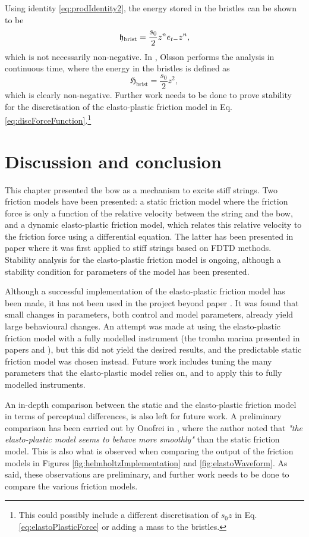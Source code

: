 Using identity \eqref{eq:prodIdentity2}, the energy stored in the bristles can be shown to be
\begin{equation}
    \mathfrak{h}_\text{brist} = \frac{s_0}{2}z^ne_{t-}z^n,
\end{equation}
which is not necessarily non-negative. In \cite{Olsson1996}, Olsson performs the analysis in continuous time, where the energy in the bristles is defined as 
\begin{equation}
    \mathfrak{H}_\text{brist} = \frac{s_0}{2} z^2,
\end{equation}
which is clearly non-negative. Further work needs to be done to prove stability for the discretisation of the elasto-plastic friction model in Eq. \eqref{eq:discForceFunction}.\footnote{This could possibly include a different discretisation of $s_0 z$ in Eq. \eqref{eq:elastoPlasticForce} or adding a mass to the bristles.}

\section{Discussion and conclusion}
This chapter presented the bow as a mechanism to excite stiff strings. Two friction models have been presented: a static friction model where the friction force is only a function of the relative velocity between the string and the bow, and a dynamic elasto-plastic friction model, which relates this relative velocity to the friction force using a differential equation. The latter has been presented in paper \citeP[C] where it was first applied to stiff strings based on FDTD methods. Stability analysis for the elasto-plastic friction model is ongoing, although a stability condition for parameters of the model has been presented.

Although a successful implementation of the elasto-plastic friction model has been made, it has not been used in the project beyond paper \citeP[C]. It was found that small changes in parameters, both control and model parameters, already yield large behavioural changes. An attempt was made at using the elasto-plastic friction model with a fully modelled instrument (the tromba marina presented in papers \citeP[D] and \citeP[E]), but this did not yield the desired results, and the predictable static friction model was chosen instead. Future work includes tuning the many parameters that the elasto-plastic model relies on, and to apply this to fully modelled instruments.

An in-depth comparison between the static and the elasto-plastic friction model in terms of perceptual differences, is also left for future work. A preliminary comparison has been carried out by Onofrei in \cite{Onofrei2021}, where the author noted that \textit{"the
elasto-plastic model seems to behave more smoothly"} than the static friction model. This is also what is observed when comparing the output of the friction models in Figures \ref{fig:helmholtzImplementation} and \ref{fig:elastoWaveform}. As said, these observations are preliminary, and further work needs to be done to compare the various friction models.

